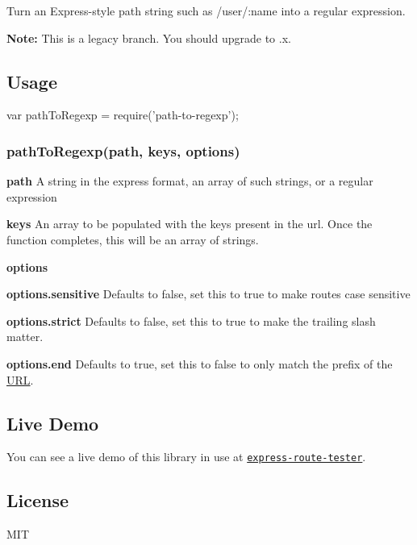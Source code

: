 Turn an Express-\/style path string such as {\ttfamily /user/\+:name} into a regular expression.

{\bfseries Note\+:} This is a legacy branch. You should upgrade to {.\+x}.

\subsection*{Usage}


\begin{DoxyCode}
var pathToRegexp = require('path-to-regexp');
\end{DoxyCode}


\subsubsection*{path\+To\+Regexp(path, keys, options)}


\begin{DoxyItemize}
\item {\bfseries path} A string in the express format, an array of such strings, or a regular expression
\item {\bfseries keys} An array to be populated with the keys present in the url. Once the function completes, this will be an array of strings.
\item {\bfseries options}
\begin{DoxyItemize}
\item {\bfseries options.\+sensitive} Defaults to false, set this to true to make routes case sensitive
\item {\bfseries options.\+strict} Defaults to false, set this to true to make the trailing slash matter.
\item {\bfseries options.\+end} Defaults to true, set this to false to only match the prefix of the \mbox{\hyperlink{namespace_u_r_l}{U\+RL}}.
\end{DoxyItemize}
\end{DoxyItemize}




\subsection*{Live Demo}

You can see a live demo of this library in use at \href{http://forbeslindesay.github.com/express-route-tester/}{\tt express-\/route-\/tester}.

\subsection*{License}

M\+IT 